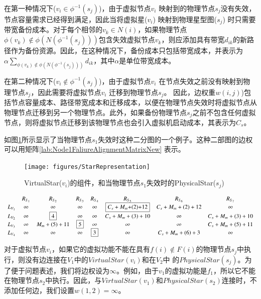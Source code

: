 在第一种情况下(${v_i} \in {\phi ^{ - 1}}({s_j})$)，由于虚拟节点$v_i$ 映射到的物理节点$s_j$没有失效，节点容量需求已经得到满足，因此当将虚拟星($v_i$) 映射到物理星型图($s_j$) 时只需要带宽备份成本。对于每个相邻的$v_k \in N(i)$，如果物理节点${\phi ({v_k}) \notin \phi (N({\phi ^{ - 1}}({s_j})))}$包含失效虚拟节点$v_k$，则应添加具有带宽$d_{ik}$的新路径作为备份资源。因此，在这种情况下，备份成本只包括带宽成本，并表示为$ { \alpha \sum\limits_{\phi ({v_k}) \notin \phi (N({\phi ^{ - 1}}({s_j})))} {{d_{ik}}} }$，其中$\alpha$是单位带宽成本。

在第二种情况下(${v_i} \notin {\phi ^{ - 1}}({s_j})$)，由于虚拟节点$v_i$ 在节点失效之前没有映射到物理节点$s_j$，因此需要将虚拟节点$v_i$ 迁移到物理节点$s_j$。 因此，边权重$w(i,j)$)包括节点容量成本、路径带宽成本和迁移成本，以便在物理节点失效时将虚拟节点从物理节点迁移到另一个物理节点。此外，如果备份物理节点$s_j$之前不包含任何虚拟节点，则将虚拟节点迁移到该物理节点也会引入虚拟机启动成本，其表示为$C_s$。

如图\ref{fig:StarRepresentation}所示显示了当物理节点$s_1$失效时这种二分图的一个例子。这种二部图的边权可以用矩阵\ref{lab:Node1FaliureAlignmentMatrixNew} 表示。
\begin{figure}
\centering
\texttt{[image: figures/StarRepresentation]}\\
  \caption{VirtualStar($v_i$)的组件，和当物理节点$s_1$失效时的PhysicalStar($s_j$)}\label{fig:StarRepresentation}
\end{figure}

\begin{equation*}
\small{
 {\begin{array}{*{20}{c}}
&R_{S_{1}}&R_{S_{2}}&R_{S_3}&R_{S_4}&R_{S_5}&R_{S_6}&R_{S_{7}}\\
{L_{V_1}}&\infty&\infty&\infty&\infty&\fbox{$C_{s}+M_{m}$+(2)+12}&C_{s}+M_{m}+(2)+12&\infty\\
L_{V_2}&\infty&\fbox{4}&\infty&\infty&C_{s}+M_{m}+(3)+10&\infty&C_{s}+M_{m}+(3)+10\\
L_{V_3}&\infty&M_{m}+(5)+11&\fbox{5}&\infty&\infty&\infty&C_{s}+M_{m}+(5)+11\\
L_{V_4}&\infty&\infty&\infty&\fbox{3}&\infty&C_{s}+M_{m}+(6)+3&\infty\\
\end{array}}
}
\label{lab:Node1FaliureAlignmentMatrixNew}
\end{equation*}


对于虚拟节点$v_i$，如果它的虚拟功能不能在具有$f(i) \notin F(i)$的物理节点$s_j$中执行，则没有边连接在$V_1$中的$VirtualStar(v_i)$和在$V_2$中 的$PhysicalStar(s_j)$。为了便于问题表述，我们将边权设为$\infty $。例如，由于$v_1$的虚拟功能是$f_1$，所以它不能在物理节点$s_2$中执行。因此，与$VirtualStar(v_1)$和$PhysicalStar(s_2)$连接时，不添加任何边，我们设置$w(1,2)=\infty$。

